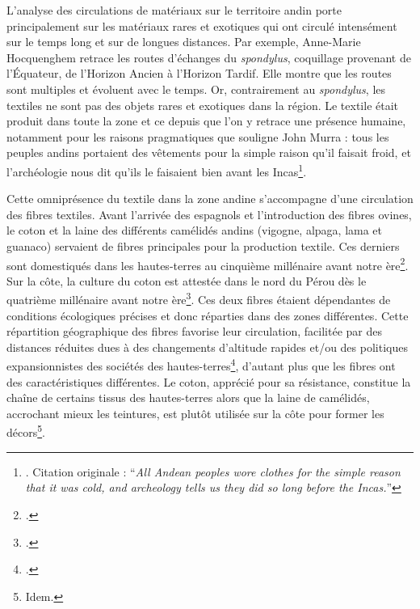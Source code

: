 L'analyse des circulations de matériaux sur le territoire andin porte principalement sur les matériaux rares et exotiques qui ont circulé intensément sur le temps long et sur de longues distances. Par exemple, Anne-Marie Hocquenghem retrace les routes d'échanges du \textit{spondylus}, coquillage provenant de l'Équateur, de l'Horizon Ancien à l'Horizon Tardif. Elle montre que les routes sont multiples et évoluent avec le temps. Or, contrairement au \textit{spondylus}, les textiles ne sont pas des objets rares et exotiques dans la région. Le textile était produit dans toute la zone et ce depuis que l'on y retrace une présence humaine, notamment pour les raisons pragmatiques que souligne John Murra : \og tous les peuples andins portaient des vêtements pour la simple raison qu'il faisait froid, et l'archéologie nous dit qu'ils le faisaient bien avant les Incas\fg\footnote{\cite[p.~716]{murraClothItsFunctions1962}. Citation originale : \textquotedblleft \textit{All Andean peoples wore clothes for the simple reason that it was cold, and archeology tells us they did so long before the Incas.}\textquotedblright}. 

Cette omniprésence du textile dans la zone andine s'accompagne d'une circulation des fibres textiles. Avant l'arrivée des espagnols et l'introduction des fibres ovines, le coton et la laine des différents camélidés andins (vigogne, alpaga, lama et guanaco) servaient de fibres principales pour la production textile. Ces derniers sont domestiqués dans les hautes-terres au cinquième millénaire avant notre ère\footcite[p.~12]{boissiereAtlasAmeriquePrecolombienne2022}. Sur la côte, la culture du coton est attestée dans le nord du Pérou dès le quatrième millénaire avant notre ère\footcite[p.~13]{boissiereAtlasAmeriquePrecolombienne2022}. Ces deux fibres étaient dépendantes de conditions écologiques précises et donc réparties dans des zones différentes. Cette répartition géographique des fibres favorise leur circulation, facilitée \og par des distances réduites dues à des changements d'altitude rapides et/ou des politiques expansionnistes des sociétés des hautes-terres\fg\footcite[p.~52]{desrosiersMatieresPremieresSavoirs2018}, d'autant plus que les fibres ont des caractéristiques différentes. Le coton, apprécié pour sa résistance, constitue la chaîne de certains tissus des hautes-terres alors que la laine de camélidés, accrochant mieux les teintures, est plutôt utilisée sur la côte pour former les décors\footnote{Idem.}.

